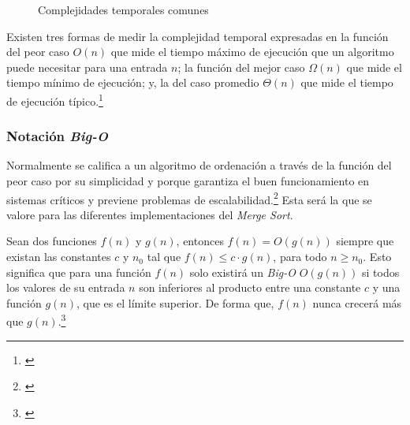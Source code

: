 \documentclass[titlepage]{article}
\begin{document}
\begin{figure}[h]
\begin{minipage}{0.49\textwidth}
			\label{fig:timeComplexities}
			\caption{Complejidades temporales comunes}
		\end{minipage}
	\end{figure}

Existen tres formas de medir la complejidad temporal expresadas en la función del peor caso \(O(n)\) que mide el tiempo máximo de ejecución que un algoritmo puede necesitar para una entrada $n$; la función del mejor caso \(\Omega(n)\) que mide el tiempo mínimo de ejecución; y, la del caso promedio \(\Theta(n)\) que mide el tiempo de ejecución típico.\footnote{\cite{levitin2012introduction}}

\subsubsection{Notación \textit{Big-O}}%
Normalmente se califica a un algoritmo de ordenación a través de la función del peor caso por su simplicidad y porque garantiza el buen funcionamiento en sistemas críticos y previene problemas de escalabilidad.\footnote{\cite{Correa2024}} Esta será la que se valore para las diferentes implementaciones del \textit{Merge Sort}.

 Sean dos funciones \(f(n)\) y \(g(n)\), entonces \(f(n) = O(g(n))\) siempre que existan las constantes \(c\) y \(n_0\) tal que \(f(n) \leq c\cdot g(n)\), para todo \(n \geq n_0\). Esto significa que para una función \(f(n)\) solo existirá un \textit{Big-O} \(O(g(n))\) si todos los valores de su entrada \(n\) son inferiores al producto entre una constante \(c\) y una función \(g(n)\), que es el límite superior. De forma que, \(f(n)\) nunca crecerá más que \(g(n)\).\footnote{\cite{Sipser1997}}
\end{document}
